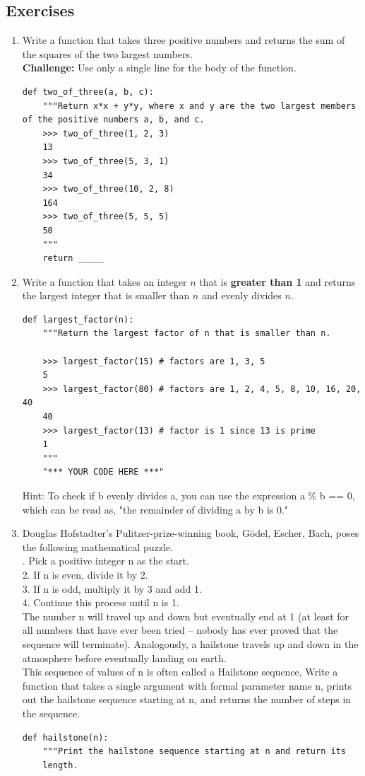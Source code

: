 \documentclass[11pt]{article}
\begin{document}
\subsection{Exercises}
\begin{enumerate}
\item Write a function that takes three positive numbers and returns the sum of the squares of the two largest numbers. \\
\textbf{Challenge:} Use only a single line for the body of the function.  
\begin{lstlisting}
def two_of_three(a, b, c):
    """Return x*x + y*y, where x and y are the two largest members of the positive numbers a, b, and c.
    >>> two_of_three(1, 2, 3)
    13
    >>> two_of_three(5, 3, 1)
    34
    >>> two_of_three(10, 2, 8)
    164
    >>> two_of_three(5, 5, 5)
    50
    """
    return _____
\end{lstlisting}
\item Write a function that takes an integer $n$ that is \textbf{greater than 1} and returns the largest integer that is smaller than $n$ and evenly divides $n$. 
\begin{lstlisting}
def largest_factor(n):
    """Return the largest factor of n that is smaller than n.

    >>> largest_factor(15) # factors are 1, 3, 5
    5
    >>> largest_factor(80) # factors are 1, 2, 4, 5, 8, 10, 16, 20, 40
    40
    >>> largest_factor(13) # factor is 1 since 13 is prime
    1
    """
    "*** YOUR CODE HERE ***"
\end{lstlisting}
Hint: To check if b evenly divides a, you can use the expression a \% b == 0, which can be read as, "the remainder of dividing a by b is 0."
\item Douglas Hofstadter's Pulitzer-prize-winning book, Gödel, Escher, Bach, poses the following mathematical puzzle. \\
. Pick a positive integer n as the start. \\
2. If n is even, divide it by 2. \\
3. If n is odd, multiply it by 3 and add 1. \\
4. Continue this process until n is 1. \\
\newline
The number n will travel up and down but eventually end at 1 (at least for all numbers that have ever been tried -- nobody has ever proved that the sequence will terminate). Analogously, a hailstone travels up and down in the atmosphere before eventually landing on earth. \\
\newline
This sequence of values of n is often called a Hailstone sequence, Write a function that takes a single argument with formal parameter name n, prints out the hailstone sequence starting at n, and returns the number of steps in the sequence. 
\begin{lstlisting}
def hailstone(n):
    """Print the hailstone sequence starting at n and return its
    length.


\end{lstlisting}
\end{enumerate}
\end{document}
